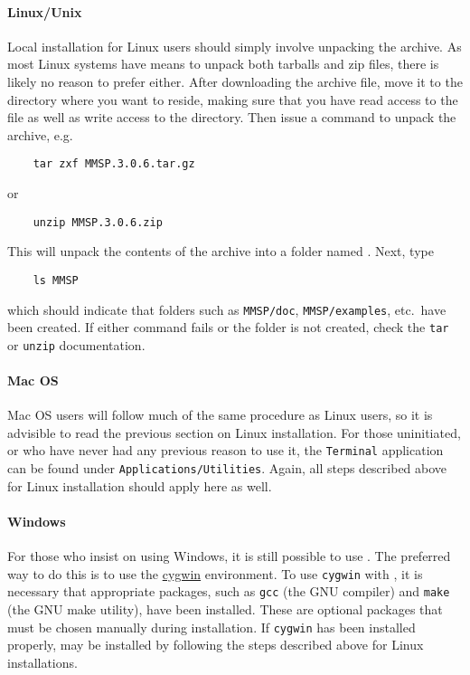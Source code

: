 \paragraph{Linux/Unix}
Local installation for Linux users should simply involve unpacking the archive.  As most Linux systems have means to unpack both tarballs and zip files, there is likely no reason to prefer either.  After downloading the archive file, move it to the directory where you want \MMSP to reside, making sure that you have read access to the file as well as write access to the directory.  Then issue a command to unpack the archive, e.g.
\begin{shadebox}
\begin{verbatim}
    tar zxf MMSP.3.0.6.tar.gz
\end{verbatim}
\end{shadebox}
or
\begin{shadebox}
\begin{verbatim}
    unzip MMSP.3.0.6.zip
\end{verbatim}
\end{shadebox}
This will unpack the contents of the archive into a folder named \MMSP.  Next, type
\begin{shadebox}
\begin{verbatim}
    ls MMSP
\end{verbatim}
\end{shadebox}
which should indicate that folders such as {\tt MMSP/doc}, {\tt MMSP/examples}, etc.~have been created.  If either command fails or the folder \MMSP is not created, check the {\tt tar} or {\tt unzip} documentation.

\paragraph{Mac OS}
Mac OS users will follow much of the same procedure as Linux users, so it is advisible to read the previous section on Linux installation.  For those uninitiated, or who have never had any previous reason to use it, the {\tt Terminal} application can be found under {\tt Applications/Utilities}.  Again, all steps described above for Linux installation should apply here as well.

\paragraph{Windows}
For those who insist on using Windows, it is still possible to use \MMSP.  The preferred way to do this is to use the \href{http://www.cygwin.com}{cygwin} environment.  To use {\tt cygwin} with \MMSP, it is necessary that appropriate packages, such as {\tt gcc} (the GNU compiler) and {\tt make} (the GNU make utility), have been installed.  These are optional packages that must be chosen manually during installation.  If {\tt cygwin} has been installed properly, \MMSP may be installed by following the steps described above for Linux installations.

